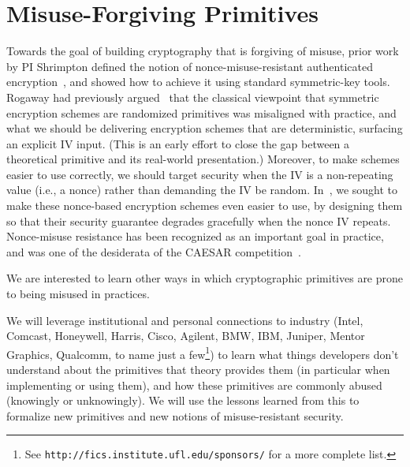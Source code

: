 \section{Misuse-Forgiving Primitives}
Towards the goal of building cryptography that is forgiving of misuse, prior
work by PI Shrimpton defined the notion of nonce-misuse-resistant authenticated
encryption~\cite{RS06}, and showed how to achieve it using standard
symmetric-key tools.  Rogaway had previously argued~\cite{Rog04} that the
classical viewpoint that symmetric encryption schemes are randomized primitives
was misaligned with practice, and what we should be delivering encryption
schemes that are deterministic, surfacing an explicit IV input. (This is an
early effort to close the gap between a theoretical primitive and its real-world
presentation.)  Moreover, to make schemes easier to use correctly, we should
target security when the IV is a non-repeating value (i.e., a nonce) rather than
demanding the IV be random.  In~\cite{RS06}, we sought to make these nonce-based
encryption schemes even easier to use, by designing them so that their security
guarantee degrades gracefully when the nonce IV repeats.  Nonce-misuse
resistance has been recognized as an important goal in practice, and was one of the
desiderata of the CAESAR competition~\cite{caesar}.
%

We are interested to learn other ways in which cryptographic
primitives are prone to being misused in practices.
\begin{task}
We will leverage institutional and personal connections to industry (Intel,
Comcast, Honeywell, Harris, Cisco, Agilent, BMW, IBM, Juniper, Mentor
Graphics, Qualcomm, to name just a few\footnote{See
  \texttt{http://fics.institute.ufl.edu/sponsors/} for a more complete
  list.}) to learn what things developers don't understand about the
primitives that theory provides them (in particular when implementing
or using them), and how these primitives are commonly abused (knowingly or
unknowingly).  We will use the lessons learned from this to formalize
new primitives and new notions of misuse-resistant security.
\end{task}

